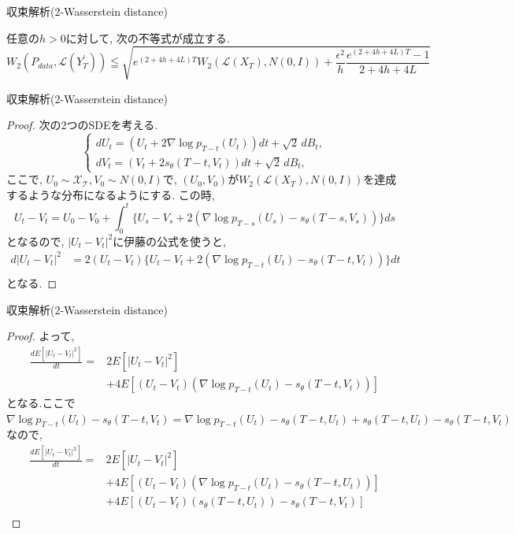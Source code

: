 \documentclass[dvipdfmx,11pt]{beamer}
\theoremstyle{plain}
\theoremstyle{定義}
\begin{document}
  \begin{frame}{収束解析(2-Wasserstein distance)}
    \begin{theorem}
      任意の$h>0$に対して, 次の不等式が成立する.
      \begin{equation*}
        W_2(P_{data},\mathcal{L}(Y^{\prime}_T))\leqq \sqrt{e^{(2+4h+4L)T}W_2(\mathcal{L}(X_T),N(0,I))+\frac{\epsilon^2}{h}\frac{e^{(2+4h+4L)T}-1}{2+4h+4L}}
      \end{equation*}
    \end{theorem}

  \end{frame}
  \begin{frame}{収束解析(2-Wasserstein distance)}
    \begin{proof}
      次の2つのSDEを考える.
      \[
        \begin{cases}
        dU_t = (U_t+2\nabla\log p_{T-t}(U_t))dt+\sqrt2\,dB_t,\\
        dV_t = (V_t+2s_\theta(T-t,V_t))dt+\sqrt2\,dB_t,
        \end{cases}
      \]
    ここで, $U_0\sim \mathcal{X_T}, V_0\sim N(0,I)$で, $(U_0,V_0)$が$W_2(\mathcal{L}(X_T),N(0,I))$を達成するような分布になるようにする.
    この時, 
    \begin{equation*}
      U_t-V_t=U_0-V_0+\int_{0}^{t}\{U_s-V_s+2(\nabla\log p_{T-s}(U_s)-s_\theta(T-s,V_s))\}ds
    \end{equation*}
    となるので, $|U_t-V_t|^2$に伊藤の公式を使うと, 
    \begin{align*}
      d|U_t-V_t|^2&=2(U_t-V_t)\{U_t-V_t+2(\nabla\log p_{T-t}(U_t)-s_\theta(T-t,V_t))\}dt\\
    \end{align*}
    となる.
  \end{proof}
    
  \end{frame}

  \begin{frame}{収束解析(2-Wasserstein distance)}
    \begin{proof}
      よって, 
      \begin{align*}
        \frac{dE[|U_t-V_t|^2]}{dt}=&2E[|U_t-V_t|^2]\\
        &+4E[(U_t-V_t)(\nabla\log p_{T-t}(U_t)-s_\theta(T-t,V_t))]
      \end{align*}
    となる.ここで$\nabla\log p_{T-t}(U_t)-s_\theta(T-t,V_t)=\nabla\log p_{T-t}(U_t)-s_\theta(T-t,U_t)+s_\theta(T-t,U_t)-s_\theta(T-t,V_t)$なので, 
      \begin{align*}
        \frac{dE[|U_t-V_t|^2]}{dt}=&2E[|U_t-V_t|^2]\\
        &+4E[(U_t-V_t)(\nabla\log p_{T-t}(U_t)-s_\theta(T-t,U_t))]\\
        &+4E[(U_t-V_t)(s_\theta(T-t,U_t))-s_\theta(T-t,V_t)]\\
      \end{align*}
    \end{proof}
  \end{frame}
\end{document}
